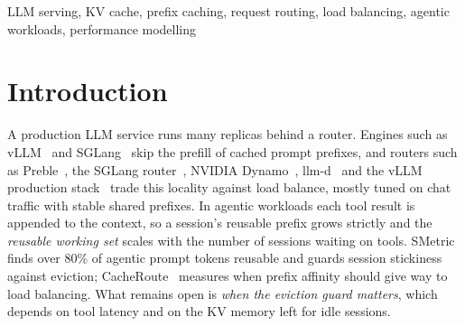 \documentclass[conference]{IEEEtran}
\begin{document}
\maketitle

\begin{abstract}
Cache-aware routers send LLM requests that share a prompt prefix to the replica that already caches it. For agentic workloads, whose prompts grow with every tool call, session-centric routing with a guard against evicted sessions beats both load balancing and pure cache affinity; we ask when that guard pays off. The deciding variable is tool-call latency: it sets the reusable working set that competes for per-replica KV memory. Using TTFT measurements in vLLM and a simulator calibrated on them, we compare eight routing policies over median tool latencies of 50~ms--60~s, with KV capacity set relative to the working set or fixed in tokens. On agentic traffic, cache-aware routing lowers p95 TTFT from 155 to 60~ms ($-$61\%) at unchanged throughput. An eviction-aware, TTFT-estimating router first leads the best eviction-oblivious locality policy by $\ge$5\% (paired 95\% CI excluding zero) at 5~s when capacity does not exceed the working set (agentic 7.5$\pm$3.9\%, 6~ms; synthetic 17$\pm$4\%, 38~ms), at 0.5--1~s when headroom is scarce, and at 10~s even with ample memory; its agentic lead grows to about 20\% (54--56~ms) at 30--60~s. Its misses are not cheaper: it cuts the tail share spent waiting behind other requests from 23--51\% to 4--7\%, and ablations show that queue-aware placement is the necessary ingredient. Multi-replica results are simulated.
\end{abstract}

\begin{IEEEkeywords}
LLM serving, KV cache, prefix caching, request routing, load balancing, agentic workloads, performance modelling
\end{IEEEkeywords}

\section{Introduction}
\label{sec:intro}

A production LLM service runs many replicas behind a router. Engines such as vLLM~\cite{r1} and SGLang~\cite{r2} skip the prefill of cached prompt prefixes, and routers such as Preble~\cite{r3}, the SGLang router~\cite{r4}, NVIDIA Dynamo~\cite{r5}, llm-d~\cite{r6} and the vLLM production stack~\cite{r7} trade this locality against load balance, mostly tuned on chat traffic with stable shared prefixes. In agentic workloads each tool result is appended to the context, so a session's reusable prefix grows strictly and the \emph{reusable working set} scales with the number of sessions waiting on tools. SMetric~\cite{r8} finds over 80\% of agentic prompt tokens reusable and guards session stickiness against eviction; CacheRoute~\cite{r9} measures when prefix affinity should give way to load balancing. What remains open is \emph{when the eviction guard matters}, which depends on tool latency and on the KV memory left for idle sessions.
\end{document}
